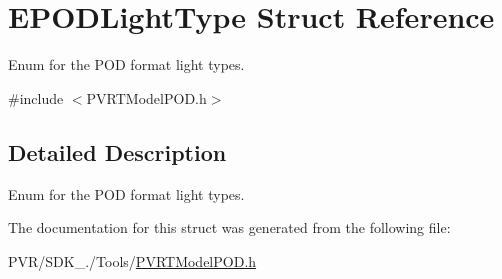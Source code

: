 \hypertarget{struct_e_p_o_d_light_type}{\section{E\+P\+O\+D\+Light\+Type Struct Reference}
\label{struct_e_p_o_d_light_type}
}


Enum for the P\+O\+D format light types.  




{\ttfamily \#include $<$P\+V\+R\+T\+Model\+P\+O\+D.\+h$>$}



\subsection{Detailed Description}
Enum for the P\+O\+D format light types. 



 

The documentation for this struct was generated from the following file\+:\begin{DoxyCompactItemize}
\item 
P\+V\+R/\+S\+D\+K\+\_./\+Tools/\hyperlink{_p_v_r_t_model_p_o_d_8h}{P\+V\+R\+T\+Model\+P\+O\+D.\+h}\end{DoxyCompactItemize}
